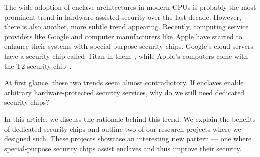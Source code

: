 The wide adoption of enclave architectures in modern CPUs is probably the most prominent trend in hardware-assisted security over the last decade. However, there is also another, more subtle trend appearing. Recently, computing service providers like Google and computer manufacturers like Apple have started to enhance their systems with special-purpose security chips. Google's cloud servers have a security chip called Titan in them~\cite{titan}, while Apple's computers come with the T2 security chip~\cite{t2}. 

At first glance, these two trends seem almost contradictory. If enclaves enable arbitrary hardware-protected security services, why do we still need dedicated security chips? 

In this article, we discuss the rationale behind this trend. We explain the benefits of dedicated security chips and outline two of our research projects where we designed such. These projects showcase an interesting new pattern --- one where special-purpose security chips assist enclaves and thus improve their security.

